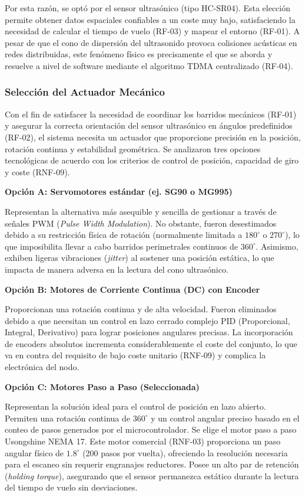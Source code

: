 Por esta razón, se optó por el sensor ultrasónico (tipo HC-SR04). Esta elección permite obtener datos espaciales confiables a un coste muy bajo, satisfaciendo la necesidad de calcular el tiempo de vuelo (RF-03) y mapear el entorno (RF-01). A pesar de que el cono de dispersión del ultrasonido provoca colisiones acústicas en redes distribuidas, este fenómeno físico es precisamente el que se aborda y resuelve a nivel de software mediante el algoritmo TDMA centralizado (RF-04).

\subsubsection*{Selección del Actuador Mecánico}

Con el fin de satisfacer la necesidad de coordinar los barridos mecánicos (RF-01) y asegurar la correcta orientación del sensor ultrasónico en ángulos predefinidos (RF-02), el sistema necesita un actuador que proporcione precisión en la posición, rotación continua y estabilidad geométrica. Se analizaron tres opciones tecnológicas de acuerdo con los criterios de control de posición, capacidad de giro y coste (RNF-09).

\textbf{Opción A: Servomotores estándar (ej. SG90 o MG995)}

Representan la alternativa más asequible y sencilla de gestionar a través de señales PWM (\textit{Pulse Width Modulation}). No obstante, fueron desestimados debido a su restricción física de rotación (normalmente limitada a $180^{\circ}$ o $270^{\circ}$), lo que imposibilita llevar a cabo barridos perimetrales continuos de $360^{\circ}$. Asimismo, exhiben ligeras vibraciones (\textit{jitter}) al sostener una posición estática, lo que impacta de manera adversa en la lectura del cono ultrasónico.

\textbf{Opción B: Motores de Corriente Continua (DC) con Encoder}

Proporcionan una rotación continua y de alta velocidad. Fueron eliminados debido a que necesitan un control en lazo cerrado complejo PID (Proporcional, Integral, Derivativo) para lograr posiciones angulares precisas. La incorporación de encoders absolutos incrementa considerablemente el coste del conjunto, lo que va en contra del requisito de bajo coste unitario (RNF-09) y complica la electrónica del nodo.

\textbf{Opción C: Motores Paso a Paso (Seleccionada)}

Representan la solución ideal para el control de posición en lazo abierto. Permiten una rotación continua de $360^{\circ}$ y un control angular preciso basado en el conteo de pasos generados por el microcontrolador. Se elige el motor paso a paso Usongshine NEMA 17. Este motor comercial (RNF-03) proporciona un paso angular físico de $1.8^{\circ}$ (200 pasos por vuelta), ofreciendo la resolución necesaria para el escaneo sin requerir engranajes reductores. Posee un alto par de retención (\textit{holding torque}), asegurando que el sensor permanezca estático durante la lectura del tiempo de vuelo sin desviaciones.

